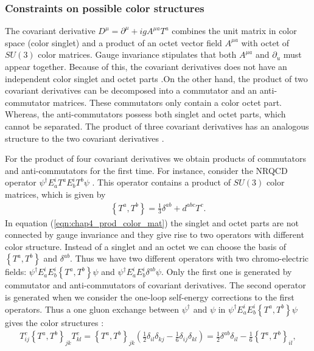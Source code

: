 \subsubsection{Constraints on possible color structures}\label{subsubsec:possible_color_struc}
\vspace{-0.3cm}
The covariant derivative $D^{\mu}=\partial^{\mu}+i g A^{\mu a} T^{a}$ combines the unit matrix in color space (color singlet) and a product
of an octet vector field $A^{\mu a}$ with octet of $SU(3)$ color matrices. Gauge invariance stipulates that both $A^{\mu a}$ and $\partial_u$ must appear together. Because of this, the covariant derivatives  does not have an independent color singlet and octet parts .On the other hand, the product of two covariant derivatives can be decomposed into a commutator and an anti-commutator matrices. These commutators only contain a color octet part. Whereas, the anti-commutators possess both singlet and octet parts, which cannot be separated. The product of three covariant derivatives has an analogous structure to the two covariant derivatives \cite{Gunawardana:2017zix}.\par
For the product of four covariant derivatives we obtain products of commutators and anti-commutators for the first time. For instance, consider the NRQCD operator $\psi^{\dagger} E_{a}^{i} T^{a} E_{b}^{i} T^{b} \psi$ \cite{Kobach:2017xkw}. This operator contains a product of $SU(3)$ color matrices, which is given by
\begin{eqnarray}\label{eqn:chap4_prod_color_mat}
\left\{T^{a}, T^{b}\right\}=\frac{1}{3} \delta^{a b}+d^{a b c} T^{c}.
\end{eqnarray}
In equation (\ref{eqn:chap4_prod_color_mat}) the singlet and octet parts are not connected by gauge invariance and they give rise to two operators with different color structure. Instead of a singlet and an octet we can choose the basis of $\left\{T^a,T^b\right\}$ and $\delta^{ab}$. Thus we have two different operators with two chromo-electric fields:  $\psi^\dagger E^i_a E^i_b\left\{T^a,T^b\right\} \psi$ and $\psi^\dagger E^i_a E^i_b \delta^{ab}\psi$. Only the first one is generated by commutator and anti-commutators of covariant derivatives. The second operator is  generated when we consider the one-loop self-energy corrections to the first operators. Thus a one gluon exchange between $\psi^\dagger$ and $\psi$ in $\psi^\dagger E^i_a E^i_b\left\{T^a,T^b\right\} \psi$ gives the color structures \cite{Gunawardana:2017zix}:
\begin{eqnarray}\label{eqn:chap4_color_struc_loop_level}
T_{i j}^{c}\left\{T^{a}, T^{b}\right\}_{j k} T_{k l}^{c}=\left\{T^{a}, T^{b}\right\}_{j k}\left(\frac{1}{2} \delta_{i l} \delta_{k j}-\frac{1}{6} \delta_{i j} \delta_{k l}\right)=\frac{1}{2} \delta^{a b} \delta_{i l}-\frac{1}{6}\left\{T^{a}, T^{b}\right\}_{i l},
\end{eqnarray}
